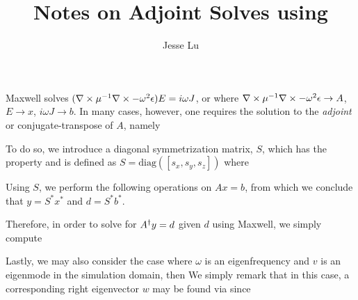 \documentclass{article}
\title{Notes on Adjoint Solves using \sc{Maxwell}}
\author{Jesse Lu}
\begin{document}
\maketitle

Maxwell solves $(\nabla\times\mu^{-1}\nabla\times - \omega^2\epsilon)E = i\omega J$, or 
    where
    \BI $\nabla\times\mu^{-1}\nabla\times - \omega^2\epsilon \to A$,
    \I  $E \to x$,
    \I  $i\omega J \to b$. \EI
In many cases, however, one requires the solution to the \emph{adjoint} or conjugate-transpose of $A$, namely

To do so, we introduce a diagonal symmetrization matrix, $S$, which has the property
    and is defined as $S = \text{diag}([ s_x, s_y, s_z])$ where

Using $S$, we perform the following operations on $Ax=b$,
    from which we conclude that $y = S^\ast x^\ast$ and $d = S^\ast b^\ast$.

Therefore, in order to solve for $A^\dagger y = d$ given $d$ using Maxwell, we simply compute

Lastly, we may also consider the case where $\omega$ is an eigenfrequency and $v$ is an eigenmode
    in the simulation domain, then
We simply remark that in this case, a corresponding right eigenvector $w$ may be found via
    since 

        

    
\end{document}
